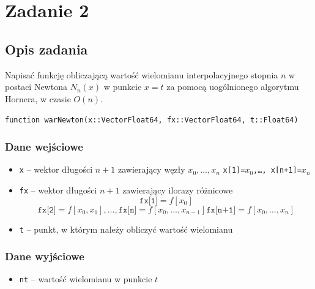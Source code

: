 \documentclass{article}
\begin{document}
\section*{Zadanie 2}
\subsection*{Opis zadania}
Napisać funkcję obliczającą wartość wielomianu interpolacyjnego stopnia $n$ w postaci Newtona $N_n(x)$ w punkcie $x = t$ za pomocą uogólnionego algorytmu Hornera, w czasie $O(n)$.

\texttt{function warNewton(x::Vector{Float64}, fx::Vector{Float64}, t::Float64)}
\subsubsection*{Dane wejściowe}
    \begin{itemize}
        \item \texttt{x} – wektor długości $n + 1$ zawierający węzły $x_0, \ldots , x_n$
\texttt{x[1]=$x_0$,\ldots, x[n+1]=$x_n$}
        \item \texttt{fx} – wektor długości $n + 1$ zawierający ilorazy różnicowe
\[
\texttt{fx[1]}=f[x_0]
\]
\[
\texttt{fx[2]}=f [x_0, x_1],\ldots, \texttt{fx[n]}=f[x_0,\ldots , x_{n-1}] \texttt{fx[n+1]}=f [x_0,\ldots, x_n]
\]
        \item \texttt{t} – punkt, w którym należy obliczyć wartość wielomianu
    \end{itemize}
\subsubsection*{Dane wyjściowe}
    \begin{itemize}
        \item \texttt{nt} – wartość wielomianu w punkcie $t$
    \end{itemize}
\end{document}
